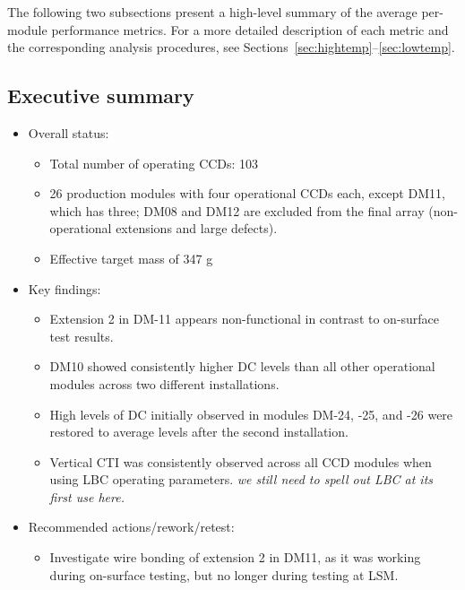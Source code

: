 \documentclass[11pt]{article}
\newcommand{\todonote}[1]{{\color{orange}\itshape #1}}
\begin{document}
The following two subsections present a high-level summary of the average per-module performance metrics. For a more detailed description of each metric and the corresponding analysis procedures, see Sections~\ref{sec:hightemp}--\ref{sec:lowtemp}.

\subsection{Executive summary}
\begin{itemize}[leftmargin=1.2em]
  \item Overall status: 
    \begin{itemize}[leftmargin=1.2em]
      \item Total number of operating CCDs: 103
      \item 26 production modules with four operational CCDs each, except DM11, which has three; DM08 and DM12 are excluded from the final array (non-operational extensions and large defects).
      \item Effective target mass of 347 g
    \end{itemize}
  
  \item Key findings:
    \begin{itemize}[leftmargin=1.2em]
      \item Extension 2 in DM-11 appears non-functional in contrast to on-surface test results.
      \item DM10 showed consistently higher DC levels than all other operational modules across two different installations.
      \item High levels of DC initially observed in modules DM-24, -25, and -26 were restored to average levels after the second installation.
      \item Vertical CTI was consistently observed across all CCD modules when using LBC operating parameters. \todonote{we still need to spell out LBC at its first use here.}
    \end{itemize}
  \item Recommended actions/rework/retest:
    \begin{itemize}[leftmargin=1.2em]
      \item Investigate wire bonding of extension 2 in DM11, as it was working during on-surface testing, but no longer during testing at LSM.
    \end{itemize}
\end{itemize}
\end{document}

